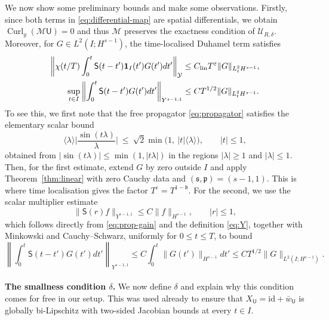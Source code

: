 \documentclass[11pt,reqno]{amsart}
\theoremstyle{plain}
\theoremstyle{definition}
\theoremstyle{remark}
\numberwithin{equation}{section}
\DeclareMathOperator{\Curl}{Curl}
\newcommand{\breg}{\mathfrak b}
\newcommand{\sreg}{\mathfrak s}
\newcommand{\preg}{\mathfrak p}
\newcommand{\Ufield}{\mathsf U}
\newcommand{\Sprop}{\mathsf S}
\begin{document}
We now show some preliminary bounds and make some observations. Firstly, since both terms in \eqref{eq:differential-map} are spatial differentials, we obtain
$\Curl_y(\mathcal M\Ufield)=0$ and thus $\mathcal{M}$ preserves the exactness condition of $\mathcal U_{R,\delta}$. Moreover, for $G\in L^2(I;H^{s-1})$, the time-localised Duhamel term satisfies
\begin{equation}\label{eq:cutoff-duhamel}
\begin{aligned}
 \left\|\chi(t/T)\int_0^t\Sprop(t-t')
       \mathbf 1_I(t')G(t') dt'\right\|_{\mathcal Y}
 &\le C_{\rm lin}T^\varepsilon\|G\|_{L^2_tH^{s-1}},\\
 \sup_{t\in I}\left\|\int_0^t\Sprop(t-t')G(t') dt'\right\|_{Y^{s-1,1}}
 &\le CT^{1/2}\|G\|_{L^2_tH^{s-1}}.
\end{aligned}
\end{equation}
To see this, we first note that the free propagator \eqref{eq:propagator} satisfies the elementary scalar bound
\begin{equation}\label{eq:prop-gain}
\langle\lambda\rangle \Big|\frac{\sin(t\lambda)}{\lambda}\Big|\ \le\
\sqrt2 \min\big(1,\ |t| \langle\lambda\rangle\big),\qquad |t|\le1 ,
\end{equation}
obtained from $|\sin(t\lambda)|\le\min(1,|t\lambda|)$ in the regions
$|\lambda|\ge1$ and $|\lambda|\le1$. Then, for the first estimate, extend $G$ by zero outside $I$ and apply Theorem~\ref{thm:linear} with zero Cauchy data and
$(\sreg,\preg)=(s-1,1)$.  This is where time localisation gives the factor
$T^\varepsilon=T^{1-\breg}$.  For the second, we use the scalar multiplier estimate
\[
 \|\Sprop(r)f\|_{Y^{s-1,1}}
 \le C\|f\|_{H^{s-1}},\qquad |r|\le1,
\]
which follows directly from \eqref{eq:prop-gain} and the definition \eqref{eq:Y}, together with  Minkowski and Cauchy--Schwarz,
uniformly for $0\le t\le T$, to bound
\[
 \left\|\int_0^t\Sprop(t-t')G(t') dt'\right\|_{Y^{s-1,1}}
 \le C\int_0^t\|G(t')\|_{H^{s-1}} dt'
 \le CT^{1/2}\|G\|_{L^2(I;H^{s-1})}.
\]
\\

\textbf{The smallness condition $\delta$.} We now define $\delta$ and explain why this condition comes for free in our setup. This was used already to ensure that $X_\Ufield=\mathrm{id}+\bar w_\Ufield$ is globally bi-Lipschitz with two-sided Jacobian
bounds at every $t\in I$. 
\end{document}
